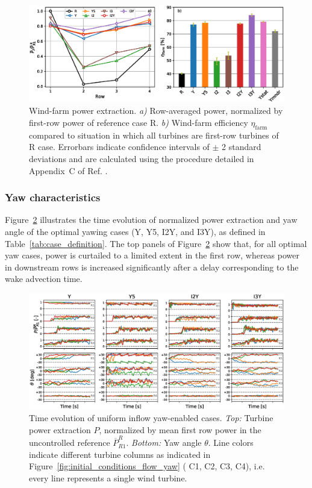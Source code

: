 \documentclass[energies,article,submit,moreauthors,latex,10pt,a4paper]{mdpi}
\begin{document}
\begin{figure}
	\includegraphics[width=\textwidth]{figure6}
	\caption{Wind-farm power extraction. \emph{a) } Row-averaged power, normalized by first-row power of reference case R. \emph{b) } Wind-farm efficiency $\eta_{\text{farm}}$ compared to situation in which all turbines are first-row turbines of R case. Errorbars indicate confidence intervals of $\pm$ 2 standard deviations and are calculated using the procedure detailed in Appendix~C of Ref. \cite{munters2017optimal}. \label{fig:power_uniform}}
\end{figure}

\subsubsection{Yaw characteristics}\label{subsec:uni_yaw}
\noindent Figure~\ref{fig:dynamic_uniform} illustrates the time evolution of normalized power extraction and yaw angle of the optimal yawing cases (Y, Y5, I2Y, and I3Y), as defined in Table~\ref{tab:case_definition}. 
The top panels of Figure~\ref{fig:dynamic_uniform} show that, for all optimal yaw cases, power is curtailed to a limited extent in the first row, whereas power in downstream rows is increased significantly after a delay corresponding to the wake advection time.  
\begin{figure}
	\includegraphics[width=\textwidth]{figure7}	
	\caption{Time evolution of uniform inflow yaw-enabled cases. \emph{Top: } Turbine power extraction $P$, normalized by mean first row power in the uncontrolled reference $\overline{P}_{R1}^R$. \emph{Bottom: } Yaw angle $\theta$. Line colors indicate different turbine columns as indicated in Figure~\ref{fig:initial_conditions_flow_yaw} ({\color{C1} C1}, {\color{C2} C2}, {\color{C3} C3}, {\color{C4} C4}), i.e. every line represents a single wind turbine. \label{fig:dynamic_uniform}}
\end{figure}
\end{document}
